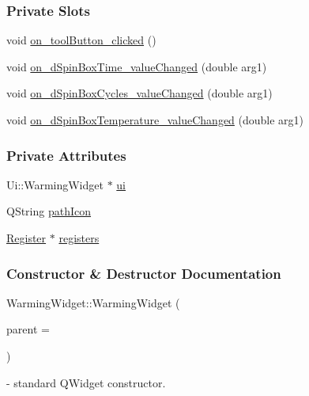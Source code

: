 \subsubsection*{Private Slots}
\begin{DoxyCompactItemize}
\item 
void \hyperlink{classWarmingWidget_af6d7762dac4bb124e1ba6ba9ea86bbeb}{on\+\_\+tool\+Button\+\_\+clicked} ()
\item 
void \hyperlink{classWarmingWidget_a26b06ccfb9f84215772231e40d2bbb4b}{on\+\_\+d\+Spin\+Box\+Time\+\_\+value\+Changed} (double arg1)
\item 
void \hyperlink{classWarmingWidget_a319141e919d6115a68dd1324464a3d8f}{on\+\_\+d\+Spin\+Box\+Cycles\+\_\+value\+Changed} (double arg1)
\item 
void \hyperlink{classWarmingWidget_a37d44b7276671774f60932d87a2dcdb5}{on\+\_\+d\+Spin\+Box\+Temperature\+\_\+value\+Changed} (double arg1)
\end{DoxyCompactItemize}
\subsubsection*{Private Attributes}
\begin{DoxyCompactItemize}
\item 
Ui\+::\+Warming\+Widget $\ast$ \hyperlink{classWarmingWidget_ae2dad8434667ce8a34454989548084b2}{ui}
\item 
Q\+String \hyperlink{classWarmingWidget_a31c1abfa505e08fb4c5f9f34e82c7d15}{path\+Icon}
\item 
\hyperlink{classRegister}{Register} $\ast$ \hyperlink{classWarmingWidget_a83bc5e6ef3f7679874a3074a750266a9}{registers}
\end{DoxyCompactItemize}


\subsubsection{Constructor \& Destructor Documentation}
{\setlength{\rightskip}{0pt plus 5cm}Warming\+Widget\+::{\texorpdfstring{Warming\+Widget}{WarmingWidget}} (
\begin{DoxyParamCaption}
\item[{Q\+Widget $\ast$}]{parent = {}}
\end{DoxyParamCaption}
)\hspace{0.3cm}{\ttfamily [explicit]}}\hypertarget{classWarmingWidget_a99e5c7ec6836696b8b0d35415a0604e7}{}\label{classWarmingWidget_a99e5c7ec6836696b8b0d35415a0604e7} - standard QWidget constructor.


